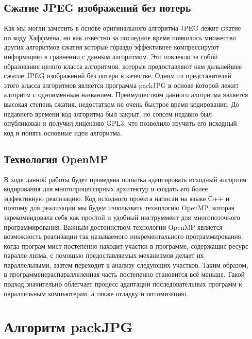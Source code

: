 \documentclass{matmex-diploma-custom}
\begin{document}

\subsection{Сжатие JPEG изображений без потерь}
Как мы могли заметить в основе оригинального алгоритма JPEG лежит сжатие по коду Хаффмена, но как известно за последние время появилось множество других алгоритмов сжатия которые гораздо эффективнее компрессируют информацию в сравнении с данным алгоритмом. Это повлекло за собой образование целого класса алгоритмов, которые предоставляют нам дальнейшее сжатие JPEG изображений без  потери в качестве.
    Одним из представителей этого класса алгоритмов является программа packJPG в основе которой лежит алгоритм с одноименным названием. Преимуществом данного алгоритма является высокая степень сжатия, недостатком не очень быстрое время кодирования. До недавнего времени код алгоритма был закрыт, но совсем недавно был опубликован и получил лицензию GPL3, что позволило изучить его исходный код и понять основные идеи алгоритма.
\subsection{Технология OpenMP}
В ходе данной работы будет проведена попытка адаптировать исходный алгоритм кодирования для многопроцессорных архитектур и создать его более эффективную реализацию. Код исходного проекта написан на языке С++ и поэтому для реализации мы будем изпользвать технологию OpenMP, которая зарекомендовала себя как простой и удобный инструммент для многопоточного программирования.
    Важным достоинством технологии OpenMP является возможность реализации так называемого инкрементального программирования, когда програм    мист постепенно находит участки в программе, содержащие ресурс паралле    лизма, с помощью предоставляемых механизмов делает их параллельными, азатем переходит к анализу следующих участков. Таким образом, в программенераспараллеленная часть постепенно становится всё меньше. Такой подход    значительно облегчает процесс адаптации последовательных программ к параллельным компьютерам, а также отладку и оптимизацию.

\section{Алгоритм packJPG}
\end{document}
